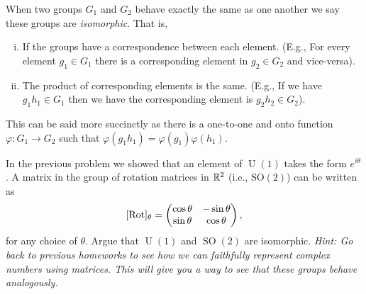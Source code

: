 \documentclass[12pt]{article} %
\begin{document}
\begin{problem}
When two groups $G_1$ and $G_2$ behave exactly the same as one another we say these groups are \emph{isomorphic}. That is,
\begin{enumerate}[i.]
    \item If the groups have a correspondence between each element. (E.g., For every element $g_1 \in G_1$ there is a corresponding element in $g_2 \in G_2$ and vice-versa).
    \item The product of corresponding elements is the same. (E.g., If we have $g_1 h_1 \in G_1$ then we have the corresponding element is $g_2 h_2 \in G_2$).
\end{enumerate}
This can be said more succinctly as there is a one-to-one and onto function $\varphi \colon G_1 \to G_2$ such that $\varphi(g_1h_1) = \varphi(g_1)\varphi(h_1)$.

In the previous problem we showed that an element of $\operatorname{U}(1)$ takes the form $e^{i\theta}$. A matrix in the group of rotation matrices in $\mathbb{R}^2$ (i.e., $\mathrm{SO}(2)$) can be written as
\[
[\mathrm{Rot}]_\theta = \begin{pmatrix} \cos \theta & - \sin \theta \\ \sin \theta & \cos \theta \end{pmatrix},
\]
for any choice of $\theta$. Argue that $\operatorname{U}(1)$ and $\operatorname{SO}(2)$ are isomorphic.  \emph{Hint: Go back to previous homeworks to see how we can faithfully represent complex numbers using matrices. This will give you a way to see that these groups behave analogously.}
\end{problem}
\end{document}
